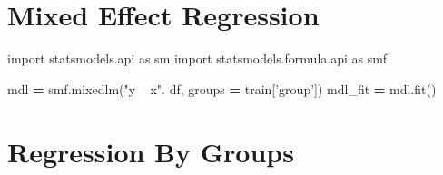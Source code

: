 \documentclass[]{book}
\newenvironment{Shaded}{\begin{snugshade}}{\end{snugshade}}
\newcommand{\ControlFlowTok}[1]{\textcolor[rgb]{0.13,0.29,0.53}{\textbf{#1}}}
\newcommand{\DataTypeTok}[1]{\textcolor[rgb]{0.13,0.29,0.53}{#1}}
\newcommand{\ImportTok}[1]{#1}
\newcommand{\KeywordTok}[1]{\textcolor[rgb]{0.13,0.29,0.53}{\textbf{#1}}}
\newcommand{\NormalTok}[1]{#1}
\newcommand{\OperatorTok}[1]{\textcolor[rgb]{0.81,0.36,0.00}{\textbf{#1}}}
\newcommand{\StringTok}[1]{\textcolor[rgb]{0.31,0.60,0.02}{#1}}
\begin{document}
\hypertarget{mixed-effect-regression}{%
\section{Mixed Effect Regression}\label{mixed-effect-regression}}

\begin{Shaded}
\begin{Highlighting}[]
\ImportTok{import}\NormalTok{ statsmodels.api }\ImportTok{as}\NormalTok{ sm}
\ImportTok{import}\NormalTok{ statsmodels.formula.api }\ImportTok{as}\NormalTok{ smf}

\NormalTok{mdl }\OperatorTok{=}\NormalTok{ smf.mixedlm(}\StringTok{"y ~ x"}\NormalTok{. df, groups }\OperatorTok{=}\NormalTok{ train[}\StringTok{'group'}\NormalTok{])}
\NormalTok{mdl_fit }\OperatorTok{=}\NormalTok{ mdl.fit()}
\end{Highlighting}
\end{Shaded}

\hypertarget{regression-by-groups}{%
\section{Regression By Groups}\label{regression-by-groups}}

\begin{Shaded}
\end{Shaded}
\end{document}
